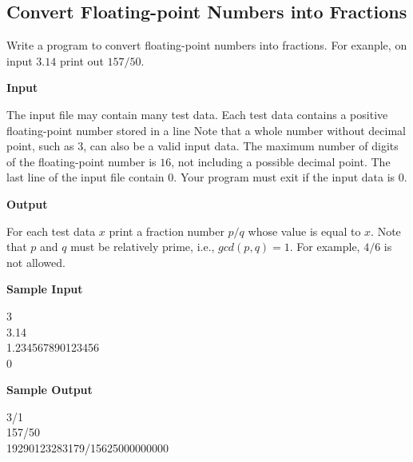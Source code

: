 \subsection{Convert Floating-point Numbers into Fractions}
Write a program to convert floating-point numbers into fractions. For exanple, on input $3.14$ print out $157/50$.

\begin{flushleft}
{\color{red} \textbf{Input}}
\end{flushleft}
The input file may contain many test data. Each test data contains a positive floating-point number stored in a line Note that a whole number without decimal point, such as $3$, can also be a valid input data. The maximum number of digits of the floating-point number is $16$, not including a possible decimal point. The last line of the input file contain $0$. Your program must exit if the input data is $0$.

\begin{flushleft}
{\color{red} \textbf{Output}}
\end{flushleft}
For each test data $x$ print a fraction number $p/q$ whose value is equal to $x$. Note that $p$ and $q$ must be relatively prime, i.e., $gcd(p, q) = 1$. For example, $4/6$ is not allowed.

\begin{flushleft}
{\color{red} \textbf{Sample Input}}
\end{flushleft}
\begin{flushleft}
3\\
3.14\\
1.234567890123456\\
0\\
\end{flushleft}

\begin{flushleft}
{\color{red} \textbf{Sample Output}}
\end{flushleft}
\begin{flushleft}
3/1\\
157/50\\
19290123283179/15625000000000\\
\end{flushleft}

\newpage